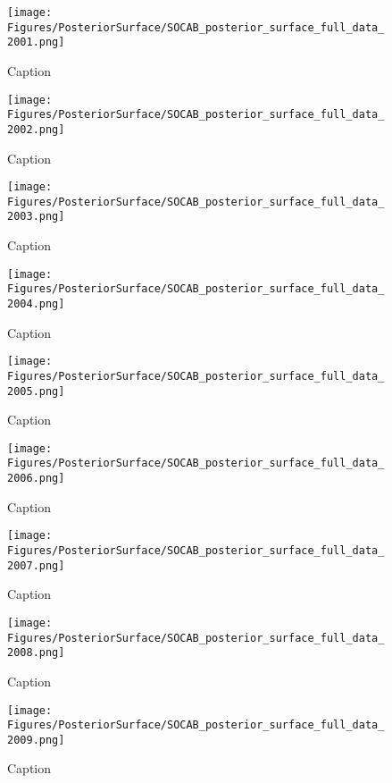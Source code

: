 \begin{figure}
    \centering
    \texttt{[image: Figures/PosteriorSurface/SOCAB\_posterior\_surface\_full\_data\_2001.png]}
    \caption{Caption}
    \label{fig:my_label}
\end{figure}

\begin{figure}
    \centering
    \texttt{[image: Figures/PosteriorSurface/SOCAB\_posterior\_surface\_full\_data\_2002.png]}
    \caption{Caption}
    \label{fig:my_label}
\end{figure}

\begin{figure}
    \centering
    \texttt{[image: Figures/PosteriorSurface/SOCAB\_posterior\_surface\_full\_data\_2003.png]}
    \caption{Caption}
    \label{fig:my_label}
\end{figure}

\begin{figure}
    \centering
    \texttt{[image: Figures/PosteriorSurface/SOCAB\_posterior\_surface\_full\_data\_2004.png]}
    \caption{Caption}
    \label{fig:my_label}
\end{figure}

\begin{figure}
    \centering
    \texttt{[image: Figures/PosteriorSurface/SOCAB\_posterior\_surface\_full\_data\_2005.png]}
    \caption{Caption}
    \label{fig:my_label}
\end{figure}

\begin{figure}
    \centering
    \texttt{[image: Figures/PosteriorSurface/SOCAB\_posterior\_surface\_full\_data\_2006.png]}
    \caption{Caption}
    \label{fig:my_label}
\end{figure}

\begin{figure}
    \centering
    \texttt{[image: Figures/PosteriorSurface/SOCAB\_posterior\_surface\_full\_data\_2007.png]}
    \caption{Caption}
    \label{fig:my_label}
\end{figure}

\begin{figure}
    \centering
    \texttt{[image: Figures/PosteriorSurface/SOCAB\_posterior\_surface\_full\_data\_2008.png]}
    \caption{Caption}
    \label{fig:my_label}
\end{figure}

\begin{figure}
    \centering
    \texttt{[image: Figures/PosteriorSurface/SOCAB\_posterior\_surface\_full\_data\_2009.png]}
    \caption{Caption}
    \label{fig:my_label}
\end{figure}

